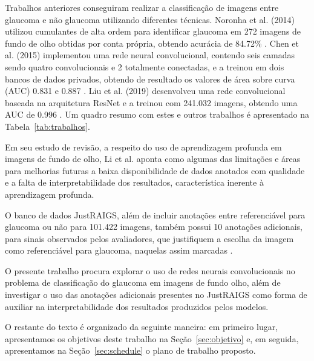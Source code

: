\documentclass[12pt]{article}
\begin{document}
Trabalhos anteriores conseguiram realizar a classificação de imagens entre glaucoma e não glaucoma utilizando diferentes técnicas. Noronha et al. (2014) utilizou cumulantes de alta ordem para identificar glaucoma em 272 imagens de fundo de olho obtidas por conta própria, obtendo acurácia de 84.72\% \cite{noronha2014hoc}. Chen et al. (2015) implementou uma rede neural convolucional, contendo seis camadas sendo quatro convolucionais e 2 totalmente conectadas, e a treinou em dois bancos de dados privados, obtendo de resultado os valores de área sobre curva (AUC) 0.831 e 0.887 \cite{chen2015cnn}. Liu et al. (2019) desenvolveu uma rede convolucional baseada na arquitetura ResNet e a treinou com 241.032 imagens, obtendo uma AUC de 0.996 \cite{liu_cnn_2019}. Um quadro resumo com estes e outros trabalhos é apresentado na Tabela~\ref{tab:trabalhos}.

Em seu estudo de revisão, a respeito do uso de aprendizagem profunda em imagens de fundo de olho, Li et al. \cite{li_review_2021} aponta como algumas das limitações e áreas para melhorias futuras a baixa disponibilidade de dados anotados com qualidade e a falta de interpretabilidade dos resultados, característica inerente à aprendizagem profunda.

O banco de dados JustRAIGS, além de incluir anotações entre referenciável para glaucoma ou não para 101.422 imagens, também possui 10 anotações adicionais, para sinais observados pelos avaliadores, que justifiquem a escolha da imagem como referenciável para glaucoma, naquelas assim marcadas \cite{justraigs_article}.

O presente trabalho procura explorar o uso de redes neurais convolucionais no problema de classificação do glaucoma em imagens de fundo olho, além de investigar o uso das anotações adicionais presentes no JustRAIGS como forma de auxiliar na interpretabilidade dos resultados produzidos pelos modelos.

O restante do texto é organizado da seguinte maneira: em primeiro lugar, apresentamos os objetivos deste trabalho na Seção~\ref{sec:objetivo} e, em seguida, apresentamos na Seção~\ref{sec:schedule} o plano de trabalho proposto.
\end{document}
